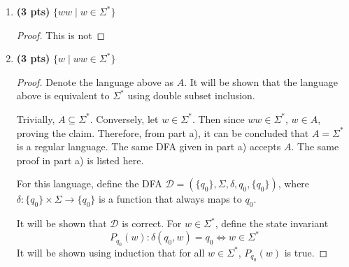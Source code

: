 \documentclass[11pt]{article}
\begin{document}
\begin{enumerate}[label=\textbf{Q\arabic*.}]
\begin{enumerate}[label=\textit{\alph*)}]
	\begin{proof}
		This is not regular. Suppose for contradiction that this language was regular. Then there would be a DFA associated with this language. Let \(q\) be the number of states in this DFA, and let \(q_0\) denote the initial state. Define the following strings:
		\[
			w_i = 0^q 1 0^{i} \text{, for } i \in \{0, 1, 2, ..., q\}
		\]
		Notice that there are \(q+1\) strings in total. By the pigeonhole principle, at least 2 \(w_i, w_j\) will be in the same state \(q_c\), \(i < j\), that is, \(\delta (q_0, w_i) = \delta (q_0, w_j) = q_c\). It follows that \(\delta (q_0, w_i 0^{q-i}) = \delta (q_0, w_j 0^{q-i})\). But notice that
		\[
			w_i = 0^q 1 0^q \text{ and } w_j = 0^q 1 0^{q+j-i} \text{.} 
		\]
		It can be seen that \(w_i\) is a palindrome and should be accepted, but because \(q + j - i \neq q\), \(w_j\) is not a palindrome, which contradicts the fact that \(w_i\) and \(w_j\) are in the same state.

	\end{proof}
	\item \textbf{(3 pts)} $ \{ww \mid w \in \Sigma^*  \} $
	
	\begin{proof}
		This is not
	\end{proof}

	\item \textbf{(3 pts)} $ \{w \mid ww \in \Sigma^*  \} $

	\begin{proof}
		Denote the language above as \(A\). It will be shown that the language above is equivalent to \(\Sigma ^*\) using double subset inclusion.

		Trivially, \(A \subseteq \Sigma ^*\). Conversely, let \(w \in \Sigma ^*\). Then since \(ww \in \Sigma ^*\), \(w \in A\), proving the claim. Therefore, from part a), it can be concluded that \(A = \Sigma ^*\) is a regular language. The same DFA given in part a) accepts \(A\). The same proof in part a) is listed here.

		For this language, define the DFA \(\mathcal{D} = (\{q_0\}, \Sigma, \delta , q_0, \{q_0\})\), where \(\delta : \{q_0\} \times \Sigma \to \{q_0\}\) is a function that always maps to \(q_0\).
		\begin{center}
		\end{center}
		It will be shown that \(\mathcal{D}\) is correct. For \(w \in \Sigma ^*\), define the state invariant
		\[
			P_{q_0}(w) : \delta (q_0, w) = q_0 \iff w \in \Sigma ^*
		\]
		It will be shown using induction that for all \(w \in \Sigma ^*\), \(P_{q_0}(w)\) is true.


\end{proof}
\end{enumerate}
\end{enumerate}
\end{document}
